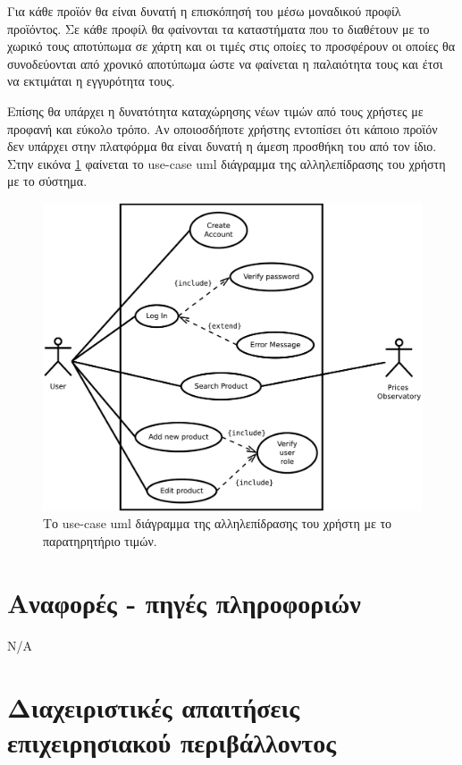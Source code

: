 \documentclass[12pt, oneside, a4paper]{report}
\begin{document}
\hspace{0.6cm}Για κάθε προϊόν θα είναι δυνατή η επισκόπησή του μέσω μοναδικού προφίλ προϊόντος. Σε κάθε προφίλ θα φαίνονται τα καταστήματα που το διαθέτουν με το χωρικό τους αποτύπωμα σε χάρτη και οι τιμές στις οποίες το προσφέρουν οι οποίες θα συνοδεύονται από χρονικό αποτύπωμα ώστε να φαίνεται η παλαιότητα τους και έτσι να εκτιμάται η εγγυρότητα τους. 

\hspace{0.6cm}Επίσης θα υπάρχει η δυνατότητα καταχώρησης νέων τιμών από τους χρήστες με προφανή και εύκολο τρόπο. Αν οποιοσδήποτε χρήστης εντοπίσει ότι κάποιο προϊόν δεν υπάρχει στην πλατφόρμα θα είναι δυνατή η άμεση προσθήκη του από τον ίδιο. Στην εικόνα \ref{uml1} φαίνεται το use-case uml διάγραμμα της αλληλεπίδρασης του χρήστη με το σύστημα.

\begin{figure}[H]
   \centering
   \includegraphics[scale=0.4,keepaspectratio=true]{./user_use_cases.pdf}
   \caption{Το use-case uml διάγραμμα της αλληλεπίδρασης του χρήστη με το παρατηρητήριο τιμών.}
    \label{uml1}
\end{figure}

\section{Αναφορές - πηγές πληροφοριών}
N/A

\section{Διαχειριστικές απαιτήσεις επιχειρησιακού περιβάλλοντος}
\end{document}
